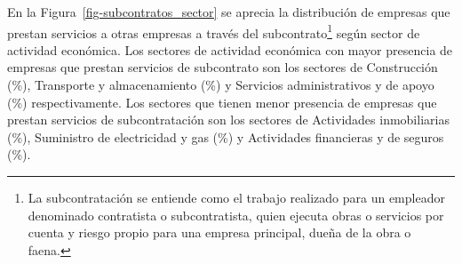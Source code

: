 \documentclass[
  11pt,
]{article}
\begin{document}
\begin{table}

\caption{\label{tbl-tipo_propiedad}Tipo de propiedad de empresas}


\end{table}%

En la Figura~\ref{fig-subcontratos_sector} se aprecia la distribución de
empresas que prestan servicios a otras empresas a través del
subcontrato\footnote{La subcontratación se entiende como el trabajo
  realizado para un empleador denominado contratista o subcontratista,
  quien ejecuta obras o servicios por cuenta y riesgo propio para una
  empresa principal, dueña de la obra o faena.} según sector de
actividad económica. Los sectores de actividad económica con mayor
presencia de empresas que prestan servicios de subcontrato son los
sectores de Construcción (\%), Transporte y almacenamiento
(\%) y Servicios administrativos y de apoyo (\%)
respectivamente. Los sectores que tienen menor presencia de empresas que
prestan servicios de subcontratación son los sectores de Actividades
inmobiliarias (\%), Suministro de electricidad y gas
(\%) y Actividades financieras y de seguros (\%).
\end{document}
